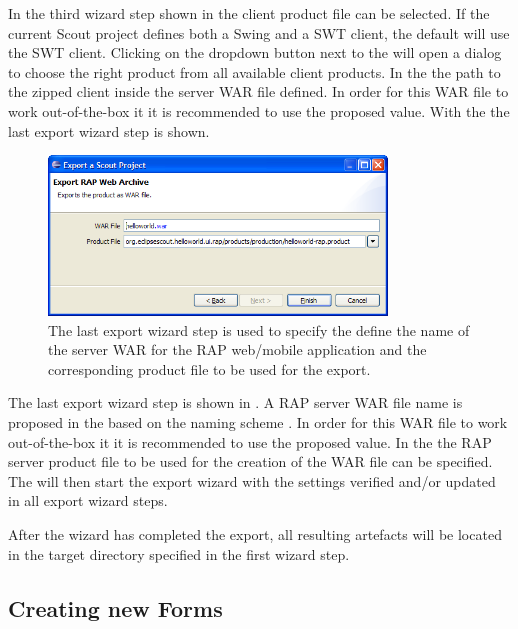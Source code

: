 \documentclass[a4paper,10pt,twoside]{book}
\begin{document}
In the third wizard step shown in  the client product file can be selected. 
If the current Scout project defines both a Swing and a SWT client, the default will use the SWT client. 
Clicking on the dropdown button next to the  will open a  dialog to choose the right product from all available client products. 
In the  the path to the zipped client inside the server WAR file defined. 
In order for this WAR file to work out-of-the-box it it is recommended to use the proposed value. 
With the  the last export wizard step is shown.

\begin{figure}
\includegraphics[width=9cm]{wizard_export_rap_server.png}
\caption{The last export wizard step is used to specify the define the name of the server WAR for the RAP web/mobile application and the corresponding product file to be used for the export.}
\end{figure}

The last export wizard step is shown in . 
A RAP server WAR file name is proposed in the  based on the naming scheme . 
In order for this WAR file to work out-of-the-box it it is recommended to use the proposed value. 
In the  the RAP server product file to be used for the creation of the WAR file can be specified. 
The  will then start the export wizard with the settings verified and/or updated in all export wizard steps. 

After the wizard has completed the export, all resulting artefacts will be located in the target directory specified in the first wizard step. 

\subsection{Creating new Forms}
\end{document}
